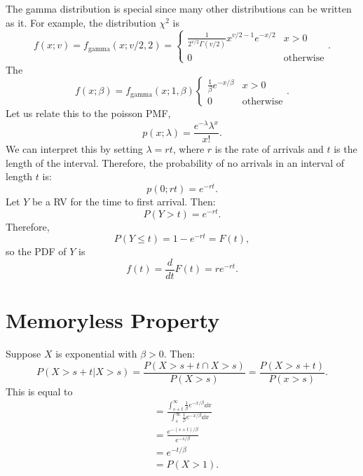 \documentclass{article}
\numberwithin{equation}{section}
\begin{document}
The gamma distribution is special since many other distributions can be written as it. For example, the  distribution $\chi^2$ is
\begin{equation}
    f(x;v) = f_\text{gamma}(x;v/2,2) = \begin{cases}
        \frac{1}{2^{v/2}\Gamma(v/2)}x^{v/2-1}e^{-x/2} & x > 0 \\
        0 & \text{otherwise}
    \end{cases}.
\end{equation}
The 
\begin{equation}
    f(x; \beta) = f_\text{gamma}(x;1,\beta)\begin{cases}
        \frac{1}{\beta}e^{-x/\beta} & x > 0 \\
        0 & \text{otherwise}
    \end{cases}.
\end{equation}
Let us relate this to the poisson PMF,
\begin{equation}
    p(x;\lambda) = \frac{e^{-\lambda}\lambda^x}{x!}.
\end{equation}
We can interpret this by setting $\lambda = rt$, where $r$ is the rate of arrivals and $t$ is the length of the interval. Therefore, the probability of no arrivals in an interval of length $t$ is:
\begin{equation}
    p(0;rt) = e^{-rt}.
\end{equation}
Let $Y$ be a RV for the time to first arrival. Then:
\begin{equation}
    P(Y>t) = e^{-rt}.
\end{equation}
Therefore,
\begin{equation}
    P(Y \le t) = 1 - e^{-rt} = F(t),
\end{equation}
so the PDF of $Y$ is
\begin{equation}
    f(t) = \frac{d}{dt}F(t) = re^{-rt}.
\end{equation}
\section{Memoryless Property}
Suppose $X$ is exponential with $\beta>0$. Then:
\begin{equation}
    P(X>s+t | X>s) = \frac{P(X > s + t \cap X >s)}{P(X > s)} = \frac{P(X > s+t)}{P(x>s)}.
\end{equation}
This is equal to 
\begin{align}
    &= \frac{\int_{s+t}^{\infty} \frac{1}{\beta}e^{-x/\beta} \dd{x}}{\int_s^\infty \frac{1}{\beta} e^{-x/\beta} \dd{x}} \\ 
    &= \frac{e^{-(s+t)/\beta}}{e^{-s/\beta}} \\ 
    &= e^{-t/\beta} \\ 
    &= P(X>1).
\end{align}
\end{document}
